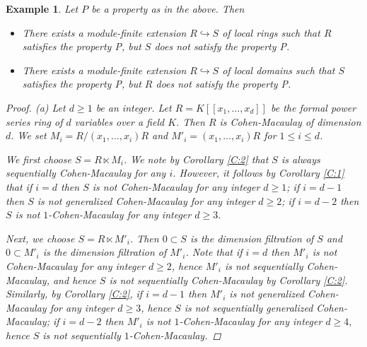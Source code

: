 \documentclass[a4papersize]{article}
\newtheorem{example}[theorem]{Example}
\begin{document}
{\begin{example} \label{E:2} {\rm Let $P$ be a property as in the above. Then}
\begin{itemize}
\item[\rm{(a)}] {\rm There exists a module-finite extension $R\hookrightarrow S$ of local rings such that  $R$ satisfies the property P, but $S$ does not satisfy the property P.}
\item[\rm{(b)}] {\rm There exists a module-finite extension $R\hookrightarrow S$ of local domains such that $S$ satisfies the property P, but $R$ does not satisfy the property P.}
\end{itemize}

\begin{proof} (a) Let $d\geq 1$ be an integer. Let $R=K[[x_1,\ldots,x_d]]$ be the formal power series ring of $d$ variables over a field $K$. Then $R$ is Cohen-Macaulay of dimension $d$.	We set $M_i=R/(x_1, \ldots , x_i)R$ and $M'_i=(x_1, \ldots , x_i)R$ for $1\leq i\leq d$.
			 
We first choose $S=R\ltimes M_i$. We note by Corollary \ref{C:2} that  $S$ is always sequentially Cohen-Macaulay for any $i$. However, it follows by Corollary \ref{C:1} that if $i=d$ then $S$ is not Cohen-Macaulay for any integer $d\geq 1$; if $i=d-1$ then $S$ is not generalized Cohen-Macaulay for any integer $d\geq 2$; if $i=d-2$ then $S$ is not $1$-Cohen-Macaulay for any integer $d\geq 3.$  
			
Next, we choose $S=R\ltimes M'_i$. Then $0\subset S$ is the dimension filtration of $S$ and $0\subset M'_i$ is the dimension filtration of $M'_i$. Note that if $i=d$ then $M'_i$ is not Cohen-Macaulay for any integer $d\geq 2$, hence $M'_i$ is not sequentially Cohen-Macaulay, and hence $S$ is not sequentially Cohen-Macaulay by Corollary \ref{C:2}. Similarly, by Corollary \ref{C:2}, if $i=d-1$ then $M'_i$ is not generalized Cohen-Macaulay for any integer $d\geq 3$, hence $S$ is not sequentially generalized Cohen-Macaulay; if $i=d-2$ then $M'_i$ is not $1$-Cohen-Macaulay for any integer $d\geq 4,$ hence $S$ is not sequentially $1$-Cohen-Macaulay.
			

\end{proof}
\end{example}}
\end{document}
